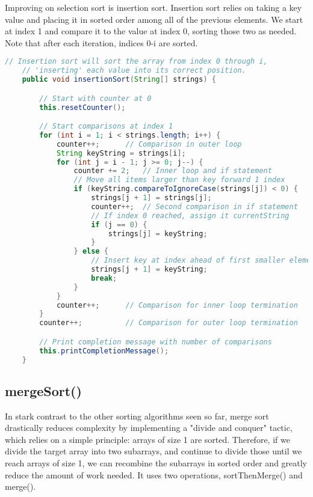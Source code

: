 \documentclass[letterpaper, 10pt]{article}
\begin{document}
\hspace{1.0em}Improving on selection sort is insertion sort. Insertion sort relies on taking a key value and placing it in sorted order among all of the previous elements. We start at index 1 and compare it to the value at index 0, sorting those two as needed. Note that after each iteration, indices 0-i are sorted.

\vspace{3.0em}

\begin{lstlisting}[language=Java, firstnumber=45]
    // Insertion sort will sort the array from index 0 through i,
    // 'inserting' each value into its correct position.
    public void insertionSort(String[] strings) {

        // Start with counter at 0
        this.resetCounter();

        // Start comparisons at index 1
        for (int i = 1; i < strings.length; i++) {
            counter++;      // Comparison in outer loop
            String keyString = strings[i];
            for (int j = i - 1; j >= 0; j--) {
                counter += 2;   // Inner loop and if statement
                // Move all items larger than key forward 1 index
                if (keyString.compareToIgnoreCase(strings[j]) < 0) {
                    strings[j + 1] = strings[j];
                    counter++;  // Second comparison in if statement
                    // If index 0 reached, assign it currentString
                    if (j == 0) {
                        strings[j] = keyString;
                    }
                } else {
                    // Insert key at index ahead of first smaller element
                    strings[j + 1] = keyString;
                    break;
                }
            }
            counter++;      // Comparison for inner loop termination
        }
        counter++;          // Comparison for outer loop termination

        // Print completion message with number of comparisons
        this.printCompletionMessage();
    }
\end{lstlisting}

\subsection{mergeSort()}

\hspace{1.0em}In stark contrast to the other sorting algorithms seen so far, merge sort drastically reduces complexity by implementing a "divide and conquer" tactic, which relies on a simple principle: arrays of size 1 are sorted. Therefore, if we divide the target array into two subarrays, and continue to divide those until we reach arrays of size 1, we can recombine the subarrays in sorted order and greatly reduce the amount of work needed. It uses two operations, sortThenMerge() and merge().
\end{document}
